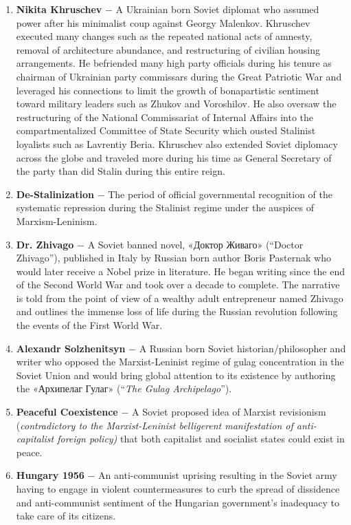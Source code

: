 \documentclass[12pt]{article}
\begin{document}
\begin{flushleft}
\begin{enumerate}
    \item \textbf{Nikita Khruschev} $-$ A Ukrainian born Soviet diplomat who assumed power after his minimalist coup against Georgy Malenkov. Khruschev executed many changes such as the repeated national acts of amnesty, removal of architecture abundance, and restructuring of civilian housing arrangements. He befriended many high party officials during his tenure as chairman of Ukrainian party commissars during the Great Patriotic War and leveraged his connections to limit the growth of bonapartistic sentiment toward military leaders such as Zhukov and Voroshilov. He also oversaw the restructuring of the National Commissariat of Internal Affairs into the compartmentalized Committee of State Security which ousted Stalinist loyalists such as Lavrentiy Beria. Khruschev also extended Soviet diplomacy across the globe and traveled more during his time as General Secretary of the party than did Stalin during this entire reign. 

    \item \textbf{De-Stalinization} $-$ The period of official governmental recognition of the systematic repression during the Stalinist regime under the auspices of Marxism-Leninism.

    \item \textbf{Dr. Zhivago} $-$ A Soviet banned novel, «Доктор Живаго» (``Doctor Zhivago''), published in Italy by Russian born author Boris Pasternak who would later receive a Nobel prize in literature. He began writing since the end of the Second World War and took over a decade to complete. The narrative is told from the point of view of a wealthy adult entrepreneur named Zhivago and outlines the immense loss of life during the Russian revolution following the events of the First World War.

    \item \textbf{Alexandr Solzhenitsyn} $-$ A Russian born Soviet historian/philosopher and writer who opposed the Marxist-Leninist regime of gulag concentration in the Soviet Union and would bring global attention to its existence by authoring the «Архипелаг Гулаг» (``\emph{The Gulag Archipelago}'').

    \item \textbf{Peaceful Coexistence} $-$ A Soviet proposed idea of Marxist revisionism (\emph{contradictory to the Marxist-Leninist belligerent manifestation of anti-capitalist foreign policy)} that both capitalist and socialist states could exist in peace.

    \item \textbf{Hungary 1956} $-$ An anti-communist uprising resulting in the Soviet army having to engage in violent countermeasures to curb the spread of dissidence and anti-communist sentiment of the Hungarian government's inadequacy to take care of its citizens. 


\end{enumerate}
\end{flushleft}
\end{document}
